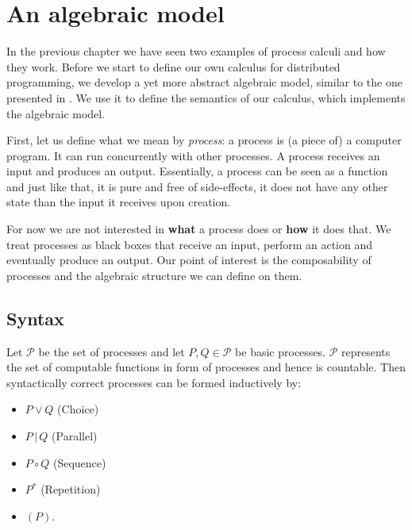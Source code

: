 \chapter{An algebraic model}
\label{chp:algebraic_model}
In the previous chapter we have seen two examples of process calculi and how they work. Before we start to define our own calculus for distributed programming, we develop a yet more abstract algebraic model, similar to the one presented in \cite{Hoare:2012:LPU:2368298.2368301}. We use it to define the semantics of our calculus, which implements the algebraic model.

First, let us define what we mean by \textit{process}: a process is (a piece of) a computer program. It can run concurrently with other processes. A process receives an input and produces an output. Essentially, a process can be seen as a function and just like that, it is pure and free of side-effects, it does not have any other state than the input it receives upon creation.

For now we are not interested in \textbf{what} a process does or \textbf{how} it does that. We treat processes as black boxes that receive an input, perform an action and eventually produce an output. Our point of interest is the composability of processes and the algebraic structure we can define on them.

\section{Syntax}
\label{chp:syntax}
Let $\mathcal{P}$ be the set of processes and let $P, Q \in \mathcal{P}$ be basic processes. $\mathcal{P}$ represents the set of computable functions in form of processes and hence is countable. Then syntactically correct processes can be formed inductively by:
\begin{itemize}
  \item $P \vee Q$ \hspace*{2em} (Choice)
  \vspace*{-0.25em}
  \item $P \,|\, Q$ \hspace*{2.5em} (Parallel)
  \vspace*{-0.25em}
  \item $P \circ Q$ \hspace*{2.2em} (Sequence)
  \vspace*{-0.25em}
  \item $P^*$ \hspace*{3.5em} (Repetition)
  \vspace*{-0.25em}
  \item $\left( P \right)$.
\end{itemize}

